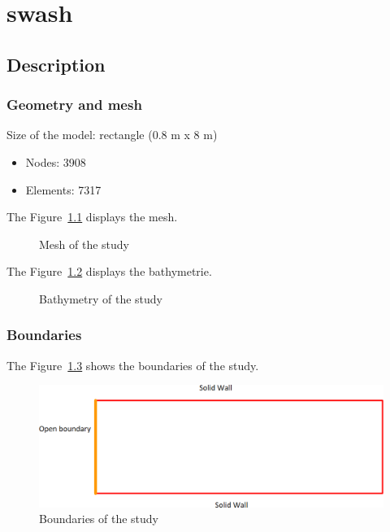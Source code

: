 \chapter{swash}


\section{Description}

\subsection{Geometry and mesh}

Size of the model: rectangle (0.8 m x 8 m)

\begin{itemize}
\item Nodes: 3908
\item Elements: 7317
\end{itemize}

The Figure~\ref{fig:swash:mesh} displays the mesh.
\begin{figure}
\centering
{}
\caption{Mesh of the study}\label{fig:swash:mesh}
\end{figure}

The Figure~\ref{fig:swash:bathy} displays the bathymetrie.
\begin{figure}
\centering
{}
\caption{Bathymetry of the study}\label{fig:swash:bathy}
\end{figure}



\subsection{Boundaries}

The Figure~\ref{fig:swash:boundaries} shows the boundaries of the study.
\begin{figure}
\centering
\includegraphics[width=.6\textwidth]{img/boundaries.png}
\caption{Boundaries of the study}\label{fig:swash:boundaries}
\end{figure}

